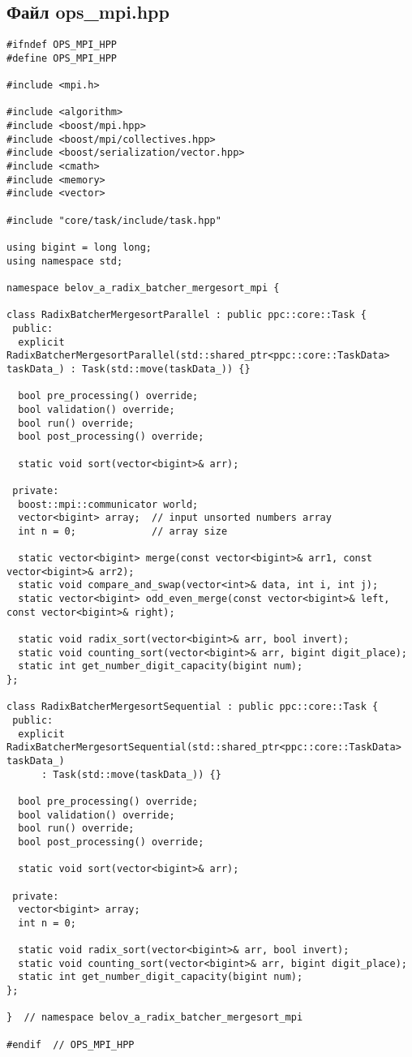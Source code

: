 ﻿\documentclass[a4paper,12pt]{article}
\begin{document}
\subsection*{Файл ops\_mpi.hpp}
\begin{lstlisting}
#ifndef OPS_MPI_HPP
#define OPS_MPI_HPP

#include <mpi.h>

#include <algorithm>
#include <boost/mpi.hpp>
#include <boost/mpi/collectives.hpp>
#include <boost/serialization/vector.hpp>
#include <cmath>
#include <memory>
#include <vector>

#include "core/task/include/task.hpp"

using bigint = long long;
using namespace std;

namespace belov_a_radix_batcher_mergesort_mpi {

class RadixBatcherMergesortParallel : public ppc::core::Task {
 public:
  explicit RadixBatcherMergesortParallel(std::shared_ptr<ppc::core::TaskData> taskData_) : Task(std::move(taskData_)) {}

  bool pre_processing() override;
  bool validation() override;
  bool run() override;
  bool post_processing() override;

  static void sort(vector<bigint>& arr);

 private:
  boost::mpi::communicator world;
  vector<bigint> array;  // input unsorted numbers array
  int n = 0;             // array size

  static vector<bigint> merge(const vector<bigint>& arr1, const vector<bigint>& arr2);
  static void compare_and_swap(vector<int>& data, int i, int j);
  static vector<bigint> odd_even_merge(const vector<bigint>& left, const vector<bigint>& right);

  static void radix_sort(vector<bigint>& arr, bool invert);
  static void counting_sort(vector<bigint>& arr, bigint digit_place);
  static int get_number_digit_capacity(bigint num);
};

class RadixBatcherMergesortSequential : public ppc::core::Task {
 public:
  explicit RadixBatcherMergesortSequential(std::shared_ptr<ppc::core::TaskData> taskData_)
      : Task(std::move(taskData_)) {}

  bool pre_processing() override;
  bool validation() override;
  bool run() override;
  bool post_processing() override;

  static void sort(vector<bigint>& arr);

 private:
  vector<bigint> array;
  int n = 0;

  static void radix_sort(vector<bigint>& arr, bool invert);
  static void counting_sort(vector<bigint>& arr, bigint digit_place);
  static int get_number_digit_capacity(bigint num);
};

}  // namespace belov_a_radix_batcher_mergesort_mpi

#endif  // OPS_MPI_HPP
\end{lstlisting}
\end{document}

